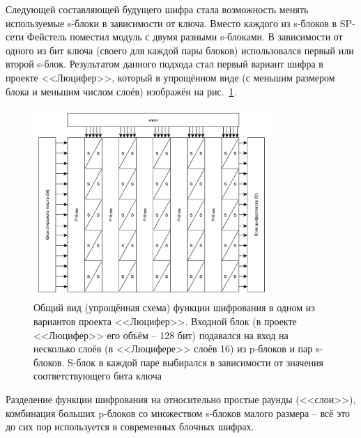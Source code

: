 Следующей составляющей будущего шифра стала возможность менять используемые s-блоки в зависимости от ключа. Вместо каждого из s-блоков в SP-сети Фейстель поместил модуль с двумя разными s-блоками. В зависимости от одного из бит ключа (своего для каждой пары блоков) использовался первый или второй s-блок. Результатом данного подхода стал первый вариант шифра в проекте <<Люцифер>>, который в упрощённом виде (с меньшим размером блока и меньшим числом слоёв) изображён на рис.~\ref{fig:lucifer}.

\begin{figure}[htb]
	\centering
	\includegraphics[width=0.8\textwidth]{pic/lucifer}
  \caption{Общий вид (упрощённая схема) функции шифрования в одном из вариантов проекта <<Люцифер>>. Входной блок (в проекте <<Люцифер>> его объём -- 128 бит) подавался на вход на несколько слоёв (в <<Люцифере>> слоёв 16) из p-блоков и пар s-блоков. S-блок в каждой паре выбирался в зависимости от значения соответствующего бита ключа}
  \label{fig:lucifer}
\end{figure}

Разделение функции шифрования на относительно простые раунды (<<слои>>), комбинация больших p-блоков со множеством s-блоков малого размера -- всё это до сих пор используется в современных блочных шифрах.

